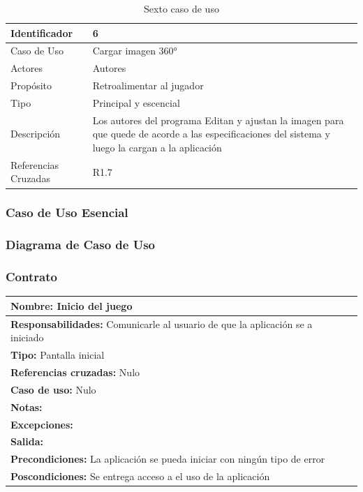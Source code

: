 \begin{table}[H]
    \begin{center}
        \begin{tabular}{| l | m{12cm} |}        
        	\hline 
        	Identificador & 6\\
        	\hline
        	Caso de Uso & Cargar imagen 360°\\
        	\hline
        	Actores & Autores\\
        	\hline
        	Propósito & Retroalimentar al jugador\\
        	\hline
        	Tipo & Principal y escencial\\
        	\hline
        	Descripción & Los autores del programa Editan y ajustan la imagen para que quede de acorde a las especificaciones del sistema y luego la cargan a la aplicación\\
        	\hline
        	Referencias Cruzadas & R1.7\\
        	\hline
        \end{tabular}
    \caption{Sexto caso de uso}
    \end{center}
\end{table}
\subsubsection{Caso de Uso Esencial}

\subsubsection{Diagrama de Caso de Uso}
\subsubsection{Contrato}
\begin{table}[H]
    \begin{center}
        \begin{tabular}{| l | m{12cm} |}       
        	\hline 
        	\textbf{Nombre:} Inicio del juego \\
        	\hline
        	\textbf{Responsabilidades:} Comunicarle al usuario de que la aplicación se a iniciado\\
        	\hline
        	\textbf{Tipo:} Pantalla inicial \\
        	\hline
        	\textbf{Referencias cruzadas:} Nulo\\
        	\hline
        	\textbf{Caso de uso:} Nulo\\
        	\hline
        	\textbf{Notas:} \\
        	\hline
        	\textbf{Excepciones:} \\
        	\hline
        	\textbf{Salida:} \\
        	\hline
        	\textbf{Precondiciones:} La aplicación se pueda iniciar con ningún tipo de error\\
        	\hline
        	\textbf{Poscondiciones:} Se entrega acceso a el uso de la aplicación\\
        	\hline
        \end{tabular}
    \end{center}
\end{table}

